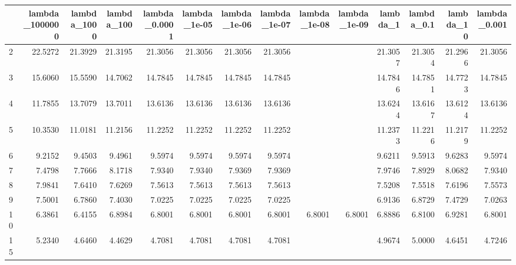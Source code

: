 \begin{tabular}{lrrrrrrrrrrrrr}
\toprule
{} &  lambda\_1000000 &  lambda\_1000 &  lambda\_100 &  lambda\_0.0001 &  lambda\_1e-05 &  lambda\_1e-06 &  lambda\_1e-07 &  lambda\_1e-08 &  lambda\_1e-09 &  lambda\_1 &  lambda\_0.1 &  lambda\_10 &  lambda\_0.001 \\
\midrule
2   &         22.5272 &      21.3929 &     21.3195 &        21.3056 &       21.3056 &       21.3056 &       21.3056 &               &               &   21.3057 &     21.3054 &    21.2966 &       21.3056 \\
3   &         15.6060 &      15.5590 &     14.7062 &        14.7845 &       14.7845 &       14.7845 &       14.7845 &               &               &   14.7846 &     14.7851 &    14.7723 &       14.7845 \\
4   &         11.7855 &      13.7079 &     13.7011 &        13.6136 &       13.6136 &       13.6136 &       13.6136 &               &               &   13.6244 &     13.6167 &    13.6124 &       13.6136 \\
5   &         10.3530 &      11.0181 &     11.2156 &        11.2252 &       11.2252 &       11.2252 &       11.2252 &               &               &   11.2373 &     11.2216 &    11.2179 &       11.2252 \\
6   &          9.2152 &       9.4503 &      9.4961 &         9.5974 &        9.5974 &        9.5974 &        9.5974 &               &               &    9.6211 &      9.5913 &     9.6283 &        9.5974 \\
7   &          7.4798 &       7.7666 &      8.1718 &         7.9340 &        7.9340 &        7.9369 &        7.9369 &               &               &    7.9746 &      7.8929 &     8.0682 &        7.9340 \\
8   &          7.9841 &       7.6410 &      7.6269 &         7.5613 &        7.5613 &        7.5613 &        7.5613 &               &               &    7.5208 &      7.5518 &     7.6196 &        7.5573 \\
9   &          7.5001 &       6.7860 &      7.4030 &         7.0225 &        7.0225 &        7.0225 &        7.0225 &               &               &    6.9136 &      6.8729 &     7.4729 &        7.0263 \\
10  &          6.3861 &       6.4155 &      6.8984 &         6.8001 &        6.8001 &        6.8001 &        6.8001 &        6.8001 &        6.8001 &    6.8886 &      6.8100 &     6.9281 &        6.8001 \\
15  &          5.2340 &       4.6460 &      4.4629 &         4.7081 &        4.7081 &        4.7081 &        4.7081 &               &               &    4.9674 &      5.0000 &     4.6451 &        4.7246 \\

\end{tabular}
